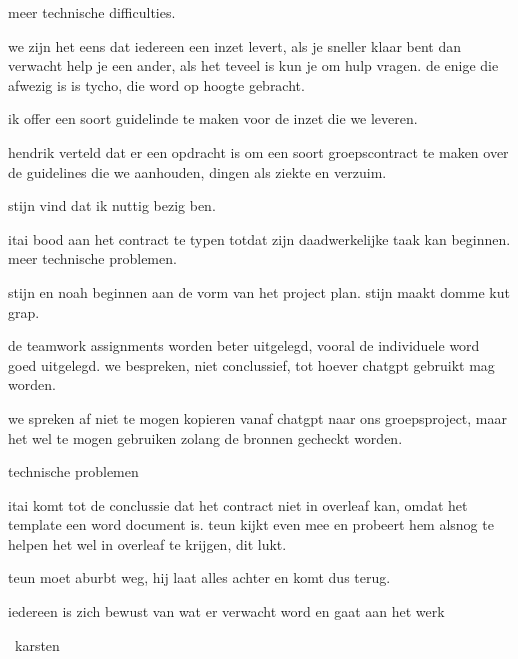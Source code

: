 meer technische difficulties.

we zijn het eens dat iedereen een inzet levert, als je sneller klaar bent dan verwacht help je een ander, als het teveel is kun je om hulp vragen.
de enige die afwezig is is tycho, die word op hoogte gebracht.

ik offer een soort guidelinde te maken voor de inzet die we leveren.

hendrik verteld dat er een opdracht is om een soort groepscontract te maken over de guidelines die we aanhouden,
dingen als ziekte en verzuim.

stijn vind dat ik nuttig bezig ben.

itai bood aan het contract te typen totdat zijn daadwerkelijke taak kan beginnen.
meer technische problemen.

stijn en noah beginnen aan de vorm van het project plan.
stijn maakt domme kut grap.

de teamwork assignments worden beter uitgelegd, vooral de individuele word goed uitgelegd.
we bespreken, niet conclussief, tot hoever chatgpt gebruikt mag worden.

we spreken af niet te mogen kopieren vanaf chatgpt naar ons groepsproject, maar het wel te mogen gebruiken zolang de bronnen gecheckt worden.

technische problemen

itai komt tot de conclussie dat het contract niet in overleaf kan, omdat het template een word document is.
teun kijkt even mee en probeert hem alsnog te helpen het wel in overleaf te krijgen, dit lukt.

teun moet aburbt weg, hij laat alles achter en komt dus terug.

iedereen is zich bewust van wat er verwacht word en gaat aan het werk

~karsten